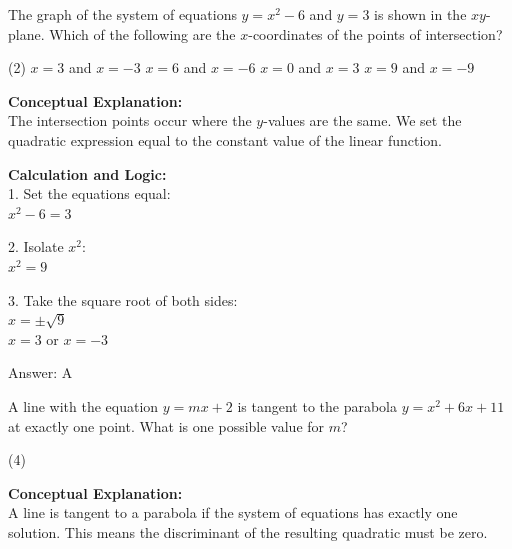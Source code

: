 \documentclass[11pt,paper=a4,answers]{exam}
\begin{document}
\begin{questions}
\vspace{40pt}

\question

The graph of the system of equations $y = x^2 - 6$ and $y = 3$ is shown in the $xy$-plane. Which of the following are the $x$-coordinates of the points of intersection?
\begin{tasks}(2)
    \task $x = 3$ and $x = -3$
    \task $x = 6$ and $x = -6$
    \task $x = 0$ and $x = 3$
    \task $x = 9$ and $x = -9$
\end{tasks}

\begin{solution}
\textbf{Conceptual Explanation:} \\
The intersection points occur where the $y$-values are the same. We set the quadratic expression equal to the constant value of the linear function.

\vspace{20pt}

\textbf{Calculation and Logic:} \\
1. Set the equations equal: \\
   $x^2 - 6 = 3$

\vspace{10pt}

2. Isolate $x^2$: \\
   $x^2 = 9$

\vspace{10pt}

3. Take the square root of both sides: \\
   $x = \pm \sqrt{9}$ \\
   $x = 3$ or $x = -3$

\vspace{25pt}

Answer: \colorbox{yellow!100}{A}
\end{solution}

\vspace{40pt}

\question
A line with the equation $y = mx + 2$ is tangent to the parabola $y = x^2 + 6x + 11$ at exactly one point. What is one possible value for $m$?
\begin{tasks}(4)
\end{tasks}

\begin{solution}
\textbf{Conceptual Explanation:} \\
A line is tangent to a parabola if the system of equations has exactly one solution. This means the discriminant of the resulting quadratic must be zero.


\end{solution}
\end{questions}
\end{document}
